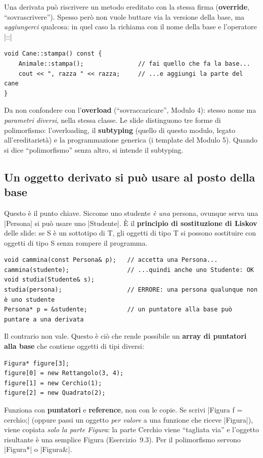 Una derivata può riscrivere un metodo ereditato con la stessa firma (\textbf{override},
``sovrascrivere''). Spesso però non vuole buttare via la versione della base, ma
\emph{aggiungerci} qualcosa: in quel caso la richiama con il nome della base e
l'operatore \cc|::|
\begin{lstlisting}
void Cane::stampa() const {
    Animale::stampa();               // fai quello che fa la base...
    cout << ", razza " << razza;     // ...e aggiungi la parte del cane
}
\end{lstlisting}
Da non confondere con l'\textbf{overload} (``sovraccaricare'', Modulo 4): stesso nome
ma \emph{parametri diversi}, nella stessa classe. Le slide distinguono tre forme di
polimorfismo: l'overloading, il \textbf{subtyping} (quello di questo modulo, legato
all'ereditarietà) e la programmazione generica (i template del Modulo 5). Quando si dice
``polimorfismo'' senza altro, si intende il subtyping.

\subsection*{Un oggetto derivato si può usare al posto della base}

Questo è il punto chiave. Siccome uno studente \emph{è una} persona, ovunque serva una
\cc|Persona| si può usare uno \cc|Studente|. È il \textbf{principio di sostituzione di
Liskov} delle slide: se S è un sottotipo di T, gli oggetti di tipo T si possono
sostituire con oggetti di tipo S senza rompere il programma.
\begin{lstlisting}
void cammina(const Persona& p);   // accetta una Persona...
cammina(studente);                // ...quindi anche uno Studente: OK
void studia(Studente& s);
studia(persona);                  // ERRORE: una persona qualunque non è uno studente
Persona* p = &studente;           // un puntatore alla base può puntare a una derivata
\end{lstlisting}
Il contrario non vale. Questo è ciò che rende possibile un \textbf{array di puntatori
alla base} che contiene oggetti di tipi diversi:
\begin{lstlisting}
Figura* figure[3];
figure[0] = new Rettangolo(3, 4);
figure[1] = new Cerchio(1);
figure[2] = new Quadrato(2);
\end{lstlisting}

\begin{trappola}
Funziona con \textbf{puntatori} e \textbf{reference}, non con le copie. Se scrivi
\cc|Figura f = cerchio;| (oppure passi un oggetto \emph{per valore} a una funzione che
riceve \cc|Figura|), viene copiata \emph{solo la parte Figura}: la parte Cerchio viene
``tagliata via'' e l'oggetto risultante è una semplice Figura (Esercizio~9.3). Per il
polimorfismo servono \cc|Figura*| o \cc|Figura&|.
\end{trappola}

